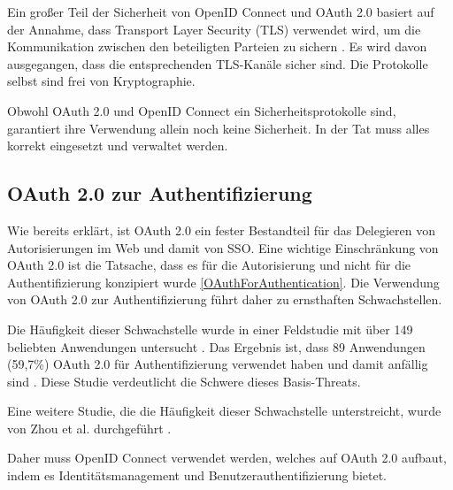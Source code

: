 Ein großer Teil der Sicherheit von OpenID Connect und OAuth 2.0 basiert auf der Annahme, dass Transport Layer Security (TLS) verwendet wird, um die Kommunikation zwischen den beteiligten Parteien zu sichern \cite{mladenov2016security}. Es wird davon ausgegangen, dass die entsprechenden TLS-Kanäle sicher sind. Die Protokolle selbst sind frei von Kryptographie.

Obwohl OAuth 2.0 und OpenID Connect ein Sicherheitsprotokolle sind, garantiert ihre Verwendung allein noch keine Sicherheit. In der Tat muss alles korrekt eingesetzt und verwaltet werden.

\subsection{OAuth 2.0 zur Authentifizierung}

Wie bereits erklärt, ist OAuth 2.0 ein fester Bestandteil für das Delegieren von Autorisierungen im Web und damit von SSO. Eine wichtige Einschränkung von OAuth 2.0 ist die Tatsache, dass es für die Autorisierung und nicht für die Authentifizierung konzipiert wurde \ref{OAuthForAuthentication}. Die Verwendung von OAuth 2.0 zur Authentifizierung führt daher zu ernsthaften Schwachstellen.

Die Häufigkeit dieser Schwachstelle wurde in einer Feldstudie mit über 149 beliebten Anwendungen untersucht \cite{chen2014oauth}. Das Ergebnis ist, dass 89 Anwendungen (59,7\%) OAuth 2.0 für Authentifizierung verwendet haben und damit anfällig sind \cite{chen2014oauth}. Diese Studie verdeutlicht die Schwere dieses Basis-Threats.

Eine weitere Studie, die die Häufigkeit dieser Schwachstelle unterstreicht, wurde von Zhou et al. durchgeführt \cite{184435}.


Daher muss OpenID Connect verwendet werden, welches auf OAuth 2.0 aufbaut, indem es Identitätsmanagement und Benutzerauthentifizierung bietet.

